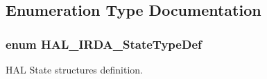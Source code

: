 \subsection{Enumeration Type Documentation}
\subsubsection[{\texorpdfstring{H\+A\+L\+\_\+\+I\+R\+D\+A\+\_\+\+State\+Type\+Def}{HAL_IRDA_StateTypeDef}}]{\setlength{\rightskip}{0pt plus 5cm}enum {\bf H\+A\+L\+\_\+\+I\+R\+D\+A\+\_\+\+State\+Type\+Def}}\hypertarget{group___i_r_d_a___exported___types_gab3e65b75c9d4ae39bc50a31222509e1e}{}\label{group___i_r_d_a___exported___types_gab3e65b75c9d4ae39bc50a31222509e1e}


H\+AL State structures definition. 

